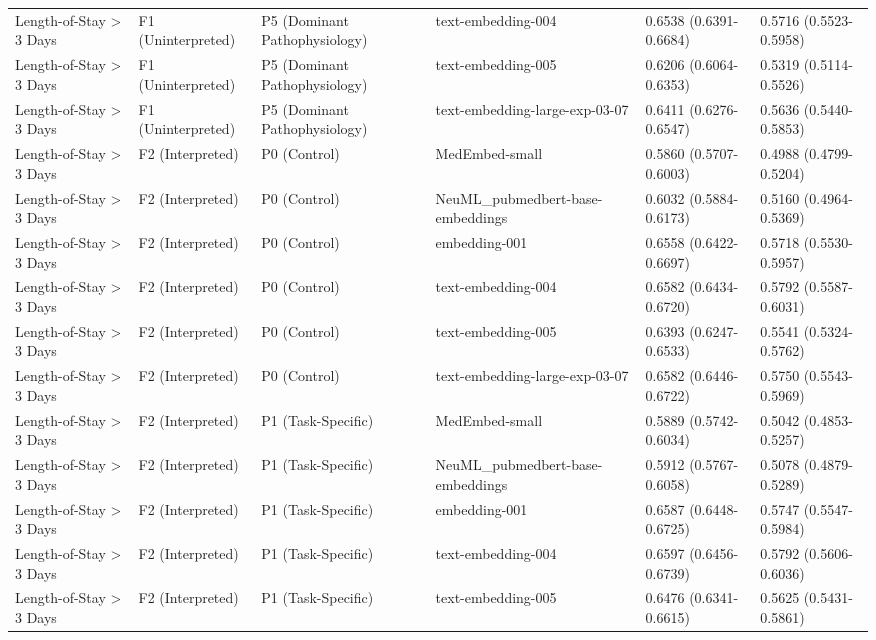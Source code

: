 \documentclass[border=0pt]{standalone}
\begin{document}
\begin{adjustbox}{width=\textwidth}
\begin{tabular}{llllll}
Length-of-Stay \textgreater{} 3 Days & F1 (Uninterpreted) & P5 (Dominant Pathophysiology) & text-embedding-004 & 0.6538 (0.6391-0.6684) & 0.5716 (0.5523-0.5958) \\
Length-of-Stay \textgreater{} 3 Days & F1 (Uninterpreted) & P5 (Dominant Pathophysiology) & text-embedding-005 & 0.6206 (0.6064-0.6353) & 0.5319 (0.5114-0.5526) \\
Length-of-Stay \textgreater{} 3 Days & F1 (Uninterpreted) & P5 (Dominant Pathophysiology) & text-embedding-large-exp-03-07 & 0.6411 (0.6276-0.6547) & 0.5636 (0.5440-0.5853) \\
Length-of-Stay \textgreater{} 3 Days & F2 (Interpreted) & P0 (Control) & MedEmbed-small & 0.5860 (0.5707-0.6003) & 0.4988 (0.4799-0.5204) \\
Length-of-Stay \textgreater{} 3 Days & F2 (Interpreted) & P0 (Control) & NeuML\_pubmedbert-base-embeddings & 0.6032 (0.5884-0.6173) & 0.5160 (0.4964-0.5369) \\
Length-of-Stay \textgreater{} 3 Days & F2 (Interpreted) & P0 (Control) & embedding-001 & 0.6558 (0.6422-0.6697) & 0.5718 (0.5530-0.5957) \\
Length-of-Stay \textgreater{} 3 Days & F2 (Interpreted) & P0 (Control) & text-embedding-004 & 0.6582 (0.6434-0.6720) & 0.5792 (0.5587-0.6031) \\
Length-of-Stay \textgreater{} 3 Days & F2 (Interpreted) & P0 (Control) & text-embedding-005 & 0.6393 (0.6247-0.6533) & 0.5541 (0.5324-0.5762) \\
Length-of-Stay \textgreater{} 3 Days & F2 (Interpreted) & P0 (Control) & text-embedding-large-exp-03-07 & 0.6582 (0.6446-0.6722) & 0.5750 (0.5543-0.5969) \\
Length-of-Stay \textgreater{} 3 Days & F2 (Interpreted) & P1 (Task-Specific) & MedEmbed-small & 0.5889 (0.5742-0.6034) & 0.5042 (0.4853-0.5257) \\
Length-of-Stay \textgreater{} 3 Days & F2 (Interpreted) & P1 (Task-Specific) & NeuML\_pubmedbert-base-embeddings & 0.5912 (0.5767-0.6058) & 0.5078 (0.4879-0.5289) \\
Length-of-Stay \textgreater{} 3 Days & F2 (Interpreted) & P1 (Task-Specific) & embedding-001 & 0.6587 (0.6448-0.6725) & 0.5747 (0.5547-0.5984) \\
Length-of-Stay \textgreater{} 3 Days & F2 (Interpreted) & P1 (Task-Specific) & text-embedding-004 & 0.6597 (0.6456-0.6739) & 0.5792 (0.5606-0.6036) \\
Length-of-Stay \textgreater{} 3 Days & F2 (Interpreted) & P1 (Task-Specific) & text-embedding-005 & 0.6476 (0.6341-0.6615) & 0.5625 (0.5431-0.5861) \\

\end{tabular}
\end{adjustbox}
\end{document}
